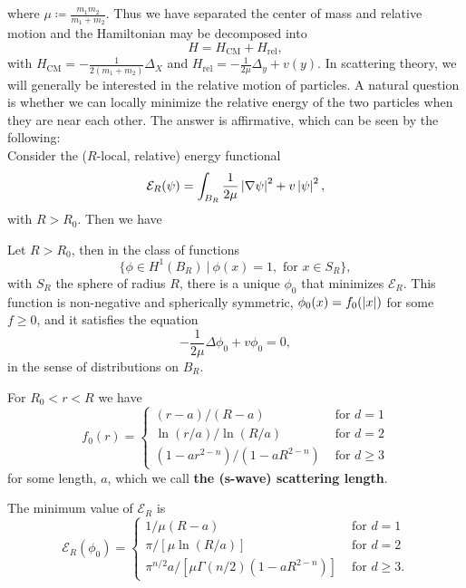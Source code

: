 where $ \mu\coloneqq \frac{m_1m_2}{m_1+m_2} $. Thus we have separated the center of mass and relative motion and the Hamiltonian may be decomposed into \begin{equation}
H=H_{\text{CM}}+H_{\text{rel}},
\end{equation}
with $ H_{\text{CM}}=-\frac{1}{2(m_1+m_2)}\Delta_X $ and $ H_{\text{rel}}=-\frac{1}{2\mu}\Delta_y+v(y) $. In scattering theory, we will generally be interested in the relative motion of particles. A natural question is whether we can locally minimize the relative energy of the two particles when they are near each other. The answer is affirmative, which can be seen by the following:\\
Consider the ($ R $-local, relative) energy functional \begin{equation}
\mathcal{E}_R(\psi)=\int_{B_R} \frac{1}{2\mu}\left\lvert \nabla\psi \right\rvert^2+v\left\lvert \psi \right\rvert^2,
\end{equation}
with $ R>R_0 $. Then we have 
\begin{theorem}\label{TheoremScatteringLength}
	Let $ R>R_0 $, then in the class of functions 
	$$ \{\phi\in H^1(B_R)\ \vert\ \phi(x)=1,\text{ for }x\in S_R\}, $$ with $ S_R $ the sphere of radius $ R $,
	there is a unique $ \phi_0 $ that minimizes $ \mathcal{E}_R $. This function is non-negative and spherically symmetric, $ \phi_0(x)=f_0(\left\lvert x \right\rvert) $ for some $ f\geq 0 $, and it satisfies the equation\begin{equation}
	-\frac{1}{2\mu}\Delta\phi_0+v\phi_0=0,
	\end{equation}
	in the sense of distributions on $ B_R $.
	
	For $ R_0<r<R $ we have \begin{equation}
	f_0(r)=\begin{cases}
	(r-a)/(R-a)&\text{ for }d=1\\
	\ln(r/a)/\ln(R/a)& \text{ for }d=2\\
	(1-ar^{2-n})/(1-aR^{2-n})& \text{ for }d\geq3
	\end{cases}
	\end{equation}
	for some length, $ a $, which we call \textbf{the (s-wave) scattering length}.
	
	The minimum value of $ \mathcal{E}_R $ is 
	\begin{equation}
	\mathcal{E}_{R}(\phi_0)=\begin{cases}
	1/\mu(R-a)&\text{ for }d=1\\
	\pi/[\mu\ln(R/a)]& \text{ for }d=2\\
	\pi^{n/2}a/[\mu\Gamma(n/2)(1-aR^{2-n})]& \text{ for }d\geq3.
	\end{cases}
	\end{equation}
\end{theorem}
